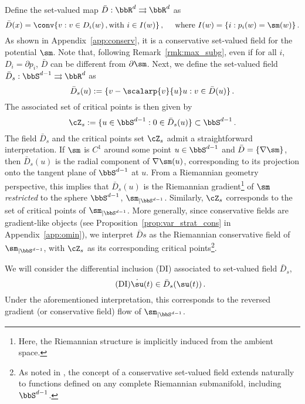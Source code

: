 Define the set-valued map $\bar{D} : \bbR^d \rightrightarrows \bbR^d$ as 
\begin{equation}\label{eq:avg_consfiel}
  \bar{D}(x) = \conv \{v: v \in D_i(w) \, , \textrm{with $i \in I(w)$} \}\,, \quad \textrm{  where $I(w) = \{ i: p_i(w) = \sm(w)\}$}\, .
\end{equation}
As shown in Appendix~\ref{app:conserv}, it is a conservative set-valued field for the potential $\sm$. Note that, following Remark~\ref{rmk:max_subg}, even if for all $i$, $D_i = \partial p_i$, $\bar{D}$ can be different from $\partial \sm$. Next, we define the set-valued field $\bar{D}_s: \bbS^{d-1} \rightrightarrows \bbR^d$ as
\begin{equation}\label{def:riem_cons}
\bar{D}_{s}(u) := \{ v - \scalarp{v}{u}u : v \in \bar{D}(u) \}\, .
\end{equation}
The associated set of critical points is then given by
\begin{equation}\label{def:riem_crit}
  \cZ_s := \{ u \in \bbS^{d-1} : 0 \in \bar{D}_s(u) \} \subset \bbS^{d-1}\, .
\end{equation}
The field $\bar{D}_s$ and the critical points set $\cZ_s$ admit a straightforward interpretation. If $\sm$ is $C^1$ around some point $u \in \bbS^{d-1}$ and $\bar{D} =\{ \nabla \sm\}$, then $\bar{D}_s(u)$ is the radial component of $\nabla \sm(u)$, corresponding to its projection onto the tangent plane of $\bbS^{d-1}$ at $u$.
From a Riemannian geometry perspective, this implies that $\bar{D}_s(u)$ is the Riemannian gradient\footnote{Here, the Riemannian structure is implicitly induced from the ambient space.} of $\sm$ \emph{restricted} to the sphere $\bbS^{d-1}$, $\sm_{|\bbS^{d-1}}$. Similarly, $\cZ_s$ corresponds to the set of critical points of $\sm_{|\bbS^{d-1}}$.
More generally, since conservative fields are gradient-like objects (see Proposition~\ref{prop:var_strat_cons} in Appendix~\ref{app:omin}), we interpret $\bar{D}s$ as the Riemannian conservative field of $\sm_{|\bbS^{d-1}}$, with $\cZ_s$ as its corresponding critical points\footnote{As noted in \cite[Page 4, footnote]{bolte2021conservative}, the concept of a conservative set-valued field extends naturally to functions defined on any complete Riemannian submanifold, including $\bbS^{d-1}$.}.


We will consider the differential inclusion (DI) associated to set-valued field $\bar{D}_s$,
\begin{equation*}\label{eq:DI_sphere}\tag{DI}
\dot{\su}(t) \in \bar{D}_{s}(\su(t))\,.
\end{equation*}
Under the aforementioned interpretation, this corresponds to the reversed gradient (or conservative field) flow of $\sm_{|\bbS^{d-1}}$. 

